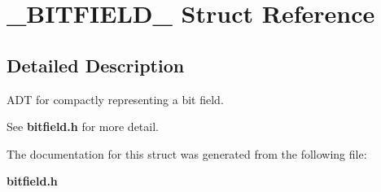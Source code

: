 \section{\_\-BITFIELD\_\- Struct Reference}
\label{struct__BITFIELD__}


\subsection{Detailed Description}
ADT for compactly representing a bit field. 

See {\bf bitfield.h} for more detail. 



The documentation for this struct was generated from the following file:\begin{CompactItemize}
\item 
{\bf bitfield.h}\end{CompactItemize}
